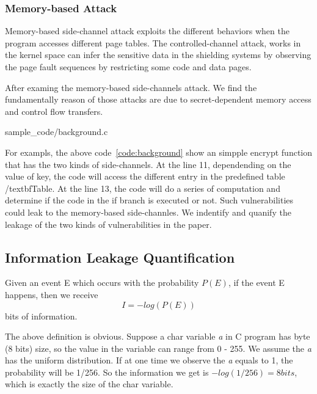 \subsubsection{Memory-based Attack}
Memory-based side-channel attack\cite{} exploits the different behaviors when the
program accesses different page tables. The controlled-channel attack\cite{7163052},
works in the kernel space can infer the sensitive data in the shielding systems by
observing the page fault sequences by restricting some code and
data pages. 

After examing the memory-based side-channels attack. We find the fundamentally
reason of those attacks are due to secret-dependent memory access and control
flow transfers.

                 {sample_code/background.c}

For exampls, the above code~\ref{code:background} show an simpple encrypt function that
has the two kinds of side-channels. At the line 11, dependending on the value of key,
the code will access the different entry in the predefined table /textbf{Table}. At the
line 13, the code will do a series of computation and determine if the code in the if
branch is executed or not. Such vulnerabilities could leak to the memory-based 
side-channles. We indentify and quanify the leakage of the two kinds of vulnerabilities 
in the paper.

\subsection{Information Leakage Quantification}
Given an event E which occurs with the probability $P(E)$, if the event E happens, 
then we receive
\begin{equation}
    I = - log(P(E))
\end{equation}
bits of information.

The above definition is obvious. Suppose a char variable \textit{a} in C program has 
byte (8 bits) size, so the value in the variable can range from 0 - 255. We assume
the \textit{a} has the uniform distribution. If at one time we observe the \textit{a}
equals to 1, the probability will be 1/256. So the information we get is 
$-log(1/256) = 8 bits$, which is exactly the size of the char variable.
